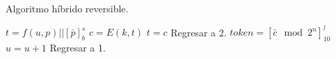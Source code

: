 
\begin{algorithm}
  \caption{\label{cod_ahr} Algoritmo híbrido reversible.}
  \begin{algorithmic}[1]
      \State $ t = f(u, p) || [\bar{p}]^s_b $
      \State $ c = E(k, t) $
        \State $ t = c $
        \State Regresar a 2.
      \EndIf
      \State $ token = {[\bar{c} \mod 2^n]}^l_{10} $
        \State $ u = u + 1 $
        \State Regresar a 1.
      \Else
        \State {}
      \EndIf
    \EndFunction
  \end{algorithmic}
\end{algorithm}
